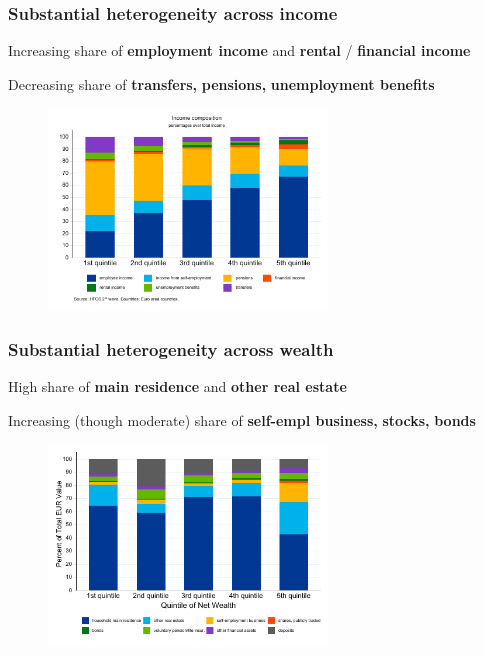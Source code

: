 \documentclass[pdflatex,aspectratio=169]{beamer}
\begin{document}
\begin{frame}\frametitle{\bf Substantial heterogeneity across income}
\bi
\item Increasing share of \textbf{\color{ao}employment income} and \textbf{\color{jgreen}rental} / \textbf{\color{red}financial income}
\item Decreasing share of \textbf{\color{amethyst} transfers,} \textbf{\color{amber} pensions,} \textbf{\color{applegreen} unemployment benefits}
\ei



\vspace*{-2.5mm}
\begin{figure}
\begin{center}
\includegraphics[width=0.66\textwidth]{./figures/incomeComposition_detailed}
\end{center}
\end{figure}

\end{frame}


\begin{frame}\frametitle{\bf Substantial heterogeneity across wealth \hypertarget{WealthSim}{}}

\bi
\item High share of \textbf{\color{ao}main residence} and \textbf{\color{capri} other real estate}
\item Increasing (though moderate) share of \textbf{\color{amber} self-empl business,} \textbf{\color{red} stocks,} \textbf{\color{jgreen} bonds}
\ei
{}
\vspace*{-2.5mm}
\begin{figure}
\begin{center}
\includegraphics[width=0.66\textwidth]{./figures/wealthCompositionDetailed} %
\end{center}
\end{figure}
\end{frame}
\end{document}
